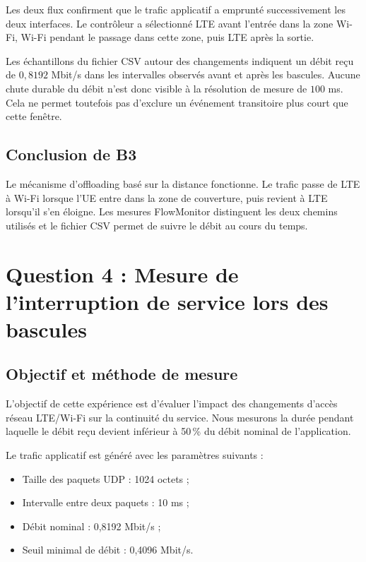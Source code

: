 Les deux flux confirment que le trafic applicatif a
emprunté successivement les deux interfaces. Le contrôleur
a sélectionné LTE avant l'entrée dans la zone Wi-Fi,
Wi-Fi pendant le passage dans cette zone, puis LTE
après la sortie.

Les échantillons du fichier CSV autour des changements
indiquent un débit reçu de $0,8192$ Mbit/s dans les
intervalles observés avant et après les bascules. Aucune
chute durable du débit n'est donc visible à la résolution
de mesure de $100$ ms. Cela ne permet toutefois pas
d'exclure un événement transitoire plus court que cette
fenêtre.

\subsection{Conclusion de B3}

Le mécanisme d'offloading basé sur la distance fonctionne.
Le trafic passe de LTE à Wi-Fi lorsque l'UE entre dans
la zone de couverture, puis revient à LTE lorsqu'il
s'en éloigne. Les mesures FlowMonitor distinguent les
deux chemins utilisés et le fichier CSV permet de suivre
le débit au cours du temps.

\section{Question 4 : Mesure de l'interruption de service lors des bascules}

\subsection{Objectif et méthode de mesure}

L'objectif de cette expérience est d'évaluer l'impact des changements
d'accès réseau LTE/Wi-Fi sur la continuité du service. Nous mesurons
la durée pendant laquelle le débit reçu devient inférieur à 50\,\%
du débit nominal de l'application.

Le trafic applicatif est généré avec les paramètres suivants :
\begin{itemize}
    \item Taille des paquets UDP : 1024 octets ;
    \item Intervalle entre deux paquets : 10 ms ;
    \item Débit nominal : 0,8192 Mbit/s ;
    \item Seuil minimal de débit : 0,4096 Mbit/s.
\end{itemize}

